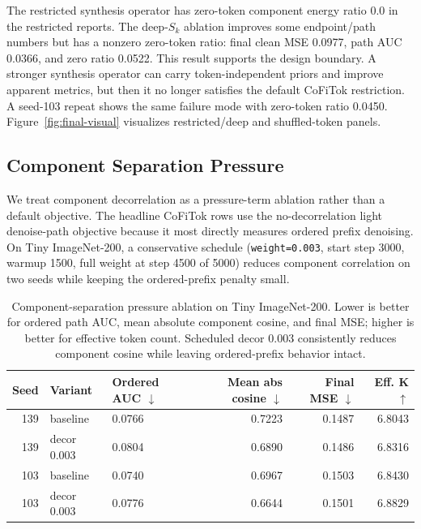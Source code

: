 \documentclass[11pt]{article}
\newcommand{\method}{CoFiTok}
\begin{document}
The restricted synthesis operator has zero-token component energy ratio 0.0 in
the restricted reports. The deep-$S_k$ ablation improves some endpoint/path
numbers but has a nonzero zero-token ratio: final clean MSE 0.0977, path AUC
0.0366, and zero ratio 0.0522. This result supports the design boundary. A
stronger synthesis operator can carry token-independent priors and improve
apparent metrics, but then it no longer satisfies the default \method{}
restriction. A seed-103 repeat shows the same failure mode with zero-token ratio
0.0450. Figure~\ref{fig:final-visual} visualizes restricted/deep and
shuffled-token panels.

\subsection{Component Separation Pressure}

We treat component decorrelation as a pressure-term ablation rather than a
default objective. The headline \method{} rows use the no-decorrelation light
denoise-path objective because it most directly measures ordered prefix
denoising. On Tiny ImageNet-200, a conservative schedule
(\texttt{weight=0.003}, start step 3000, warmup 1500, full weight at step 4500
of 5000) reduces component correlation on two seeds while keeping the
ordered-prefix penalty small.

\begin{table}[t]
  \centering
  \caption{Component-separation pressure ablation on Tiny ImageNet-200. Lower is
  better for ordered path AUC, mean absolute component cosine, and final MSE;
  higher is better for effective token count. Scheduled decor 0.003 consistently
  reduces component cosine while leaving ordered-prefix behavior intact.}
  \label{tab:decor}
  \begin{tabular}{rllrrr}
    \toprule
    Seed & Variant & Ordered AUC $\downarrow$ & Mean abs cosine $\downarrow$ & Final MSE $\downarrow$ & Eff. K $\uparrow$ \\
    \midrule
    139 & baseline & 0.0766 & 0.7223 & 0.1487 & 6.8043 \\
    139 & decor 0.003 & 0.0804 & 0.6890 & 0.1486 & 6.8316 \\
    103 & baseline & 0.0740 & 0.6967 & 0.1503 & 6.8430 \\
    103 & decor 0.003 & 0.0776 & 0.6644 & 0.1501 & 6.8829 \\
    \bottomrule
  \end{tabular}
\end{table}
\end{document}
